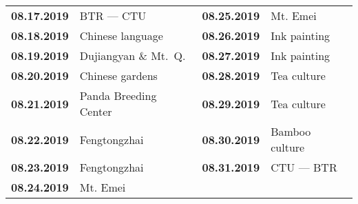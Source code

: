 \documentclass[11pt,article,oneside]{memoir}
\begin{document}
\begin{table}[H]
\begin{tabular}{l l @{\hskip 1cm} l l}
\\
\textbf{08.17.2019} & BTR --- CTU & \textbf{08.25.2019} & Mt. Emei \\
\textbf{08.18.2019} & Chinese language & \textbf{08.26.2019} & Ink painting \\
\textbf{08.19.2019} & Dujiangyan \& Mt.~Q. & \textbf{08.27.2019} & Ink painting \\
\textbf{08.20.2019} & Chinese gardens & \textbf{08.28.2019} & Tea culture \\
\textbf{08.21.2019} & Panda Breeding Center & \textbf{08.29.2019} & Tea culture \\
\textbf{08.22.2019} & Fengtongzhai & \textbf{08.30.2019} & Bamboo culture \\
\textbf{08.23.2019} & Fengtongzhai & \textbf{08.31.2019} & CTU --- BTR \\
\textbf{08.24.2019} & Mt. Emei \\
%
\end{tabular}
\end{table}

\end{document}
